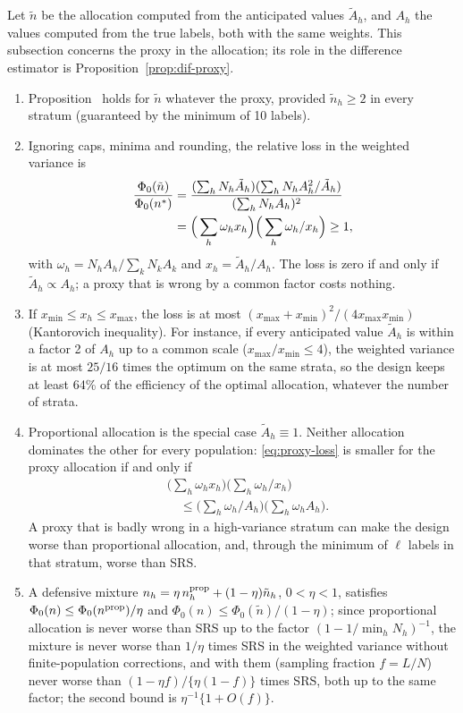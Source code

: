 Let $\tilde n$ be the allocation computed from the anticipated values $\tilde A_h$, and $A_h$ the
values computed from the true labels, both with the same weights. This subsection concerns the proxy in the allocation; its role in the
difference estimator is Proposition~\ref{prop:dif-proxy}.

\begin{proposition}\label{prop:proxy}
\begin{enumerate}
\item[(a)] Proposition~ holds for $\tilde n$ whatever the proxy, provided
$\tilde n_h\ge2$ in every stratum (guaranteed by the minimum of 10 labels).
\item[(b)] Ignoring caps, minima and rounding, the relative loss in the weighted variance is
\begin{align}
\frac{\Phi_0(\tilde n)}{\Phi_0(n^\ast)}&=
\frac{(\sum_hN_h\tilde A_h)(\sum_hN_hA_h^2/\tilde A_h)}{(\sum_hN_hA_h)^2}\notag\\
&=\Big(\sum_h\omega_hx_h\Big)\Big(\sum_h\omega_h/x_h\Big)\ge1,\label{eq:proxy-loss}
\end{align}
with $\omega_h=N_hA_h/\sum_kN_kA_k$ and $x_h=\tilde A_h/A_h$. The loss is zero if and only if
$\tilde A_h\propto A_h$; a proxy that is wrong by a common factor costs nothing.
\item[(c)] If $x_{\min}\le x_h\le x_{\max}$, the loss is at most
$(x_{\max}+x_{\min})^2/(4x_{\max}x_{\min})$ (Kantorovich inequality). For instance, if every
anticipated value $\tilde A_h$ is within a factor 2 of $A_h$ up to a common scale
($x_{\max}/x_{\min}\le4$), the weighted variance is at most $25/16$ times the optimum on the same
strata, so the design keeps at least 64\% of the efficiency of the optimal allocation, whatever
the number of strata.
\item[(d)] Proportional allocation is the special case $\tilde A_h\equiv1$. Neither allocation
dominates the other for every population: \eqref{eq:proxy-loss} is smaller for the proxy
allocation if and only if
\begin{align*}
&\Big(\sum_h\omega_hx_h\Big)\Big(\sum_h\omega_h/x_h\Big)\\
&\quad\le\Big(\sum_h\omega_h/A_h\Big)\Big(\sum_h\omega_hA_h\Big).
\end{align*}
A proxy that is badly wrong in a high-variance stratum can make the design worse than
proportional allocation, and, through the minimum of $\ell$ labels in that stratum, worse than SRS.
\item[(e)] A defensive mixture $n_h=\eta\,n^{\rm prop}_h+(1-\eta)\tilde n_h$, $0<\eta<1$, satisfies
$\Phi_0(n)\le\Phi_0(n^{\rm prop})/\eta$ and $\Phi_0(n)\le\Phi_0(\tilde n)/(1-\eta)$; since
proportional allocation is never worse than SRS up to the factor $(1-1/\min_hN_h)^{-1}$, the
mixture is never worse than $1/\eta$ times SRS in the weighted variance without finite-population corrections, and with them (sampling fraction $f=L/N$) never worse than $(1-\eta f)/\{\eta(1-f)\}$ times SRS,
both up to the same factor; the second bound is $\eta^{-1}\{1+O(f)\}$.
\end{enumerate}
\end{proposition}

